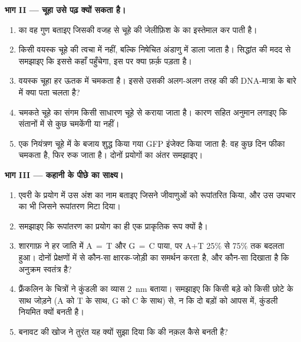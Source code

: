 \begin{problem}
\medskip
\noindent\textbf{भाग II --- चूहा उसे पढ़ क्यों सकता है।}
\begin{enumerate}[resume]
  \item {} का वह गुण बताइए जिसकी वजह से चूहे की  जेलीफ़िश के 
        का इस्तेमाल कर पाती है।
  \item {} किसी वयस्क चूहे की त्वचा में नहीं, बल्कि निषेचित अंडाणु में
        डाला जाता है।  सिद्धांत की मदद से समझाइए कि इससे  कहाँ
        पहुँचेगा, इस पर क्या फ़र्क़ पड़ता है।
  \item वयस्क चूहा हर ऊतक में चमकता है। इससे उसकी अलग-अलग तरह की
         की DNA-मात्रा के बारे में क्या पता चलता है?
  \item चमकते चूहे का संगम किसी साधारण चूहे से कराया जाता है। कारण सहित
        अनुमान लगाइए कि संतानों में से कुछ चमकेंगी या नहीं।
  \item एक नियंत्रण चूहे में  के बजाय शुद्ध किया गया GFP 
        इंजेक्ट किया जाता है: वह कुछ दिन फीका चमकता है, फिर रुक जाता है।
        दोनों प्रयोगों का अंतर समझाइए।
\end{enumerate}

\medskip
\noindent\textbf{भाग III --- कहानी के पीछे का साक्ष्य।}
\begin{enumerate}[resume]
  \item एवरी के प्रयोग में उस अंश का नाम बताइए जिसने जीवाणुओं को
        रूपांतरित किया, और उस उपचार का भी जिसने रूपांतरण मिटा दिया।
  \item समझाइए कि रूपांतरण का प्रयोग  का ही एक प्राकृतिक रूप
        क्यों है।
  \item शारगाफ़ ने हर जाति में A$\,=\,$T और G$\,=\,$C पाया, पर A+T 25\%
        से 75\% तक बदलता हुआ। दोनों प्रेक्षणों में से कौन-सा
        क्षारक-जोड़ी का समर्थन करता है, और कौन-सा दिखाता है कि अनुक्रम
        स्वतंत्र है?
  \item फ़्रैंकलिन के चित्रों ने कुंडली का व्यास \qty{2}{nm} बताया।
        समझाइए कि किसी बड़े  को किसी छोटे के साथ जोड़ने (A को T के
        साथ, G को C के साथ) से, न कि दो बड़ों को आपस में, कुंडली नियमित
        क्यों बनती है।
  \item बनावट की खोज ने तुरंत यह क्यों सुझा दिया कि  की नक़ल कैसे
        बनती है?
\end{enumerate}


\end{problem}
